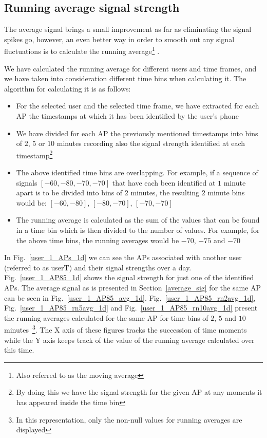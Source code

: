 \subsection{Running average signal strength}
\label{running_avg}
The average signal brings a small improvement as far as eliminating the signal
spikes go, however, an even better way in order to smooth out any signal
fluctuations is to calculate the running average\footnote{Also referred to as
the moving average} \cite{Hyndman09movingaverages}.

We have calculated the running average for different users and time frames, and
we have taken into consideration different time bins when calculating it. The
algorithm for calculating it is as follows:
\begin{itemize}
  \item For the selected user and the selected time frame, we have extracted for
  each AP the timestamps at which it has been identified by the user's phone
  \item We have divided for each AP the previously mentioned timestamps into
  bins of $2$, $5$ or $10$ minutes recording also the signal strength identified
  at each timestamp\footnote{By doing this we have the signal strength for the
  given AP at any moments it has appeared inside the time bin}
  \item The above identified time bins are overlapping. For example, if a
  sequence of signals $[-60, -80, -70, -70]$ that have each been identified at
  $1$ minute apart is to be divided into bins of $2$ minutes, the resulting $2$
  minute bins would be: $[-60, -80]$, $[-80, -70]$, $[-70, -70]$
  \item The running average is calculated as the sum of the values that can be
  found in a time bin which is then divided to the number of values. For
  example, for the above time bins, the running averages would be $-70$, $-75$
  and $-70$
\end{itemize}

In Fig.~\ref{user_1_APs_1d} we can see the APs associated with another user
(referred to as userT) and their signal strengths over a day.
Fig.~\ref{user_1_AP85_1d} shows the signal strength for just one of the
identified APs. The average signal as is presented in Section~\ref{average_sig}
for the same AP can be seen in Fig.~\ref{user_1_AP85_avg_1d}.
Fig.~\ref{user_1_AP85_rn2avg_1d}, Fig.~\ref{user_1_AP85_rn5avg_1d} and
Fig.~\ref{user_1_AP85_rn10avg_1d} present the running averages calculated for
the same AP for time bins of $2$, $5$ and $10$ minutes~\footnote{In this
representation, only the non-null values for running averages are displayed}.
The X axis of these figures tracks the succession of time moments while the Y
axis keeps track of the value of the running average calculated over this time.

